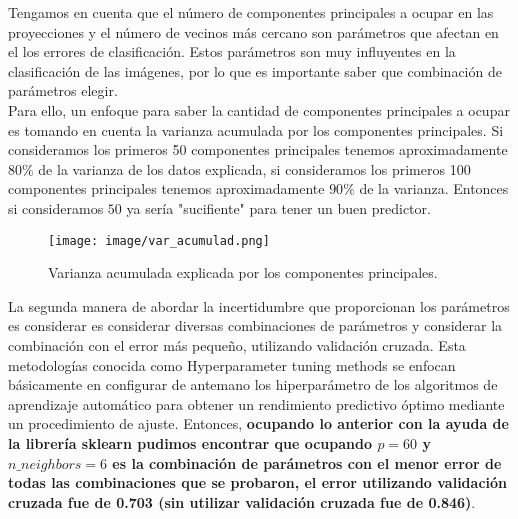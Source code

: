 \documentclass[paper=letter, fontsize=11pt]{scrartcl}
\numberwithin{equation}{section} %
\numberwithin{figure}{section} %
\numberwithin{table}{section} %
\begin{document}
Tengamos en cuenta que el número de componentes principales a ocupar en las proyecciones y el número de vecinos más cercano son parámetros que afectan en el  los errores de clasificación. Estos parámetros son muy influyentes en la clasificación de las imágenes, por lo que es importante saber que combinación de parámetros elegir. \\

Para ello, un enfoque para saber la cantidad de componentes principales a ocupar es tomando en cuenta la varianza acumulada por los componentes principales. Si consideramos los primeros 50 componentes principales tenemos aproximadamente $80\%$ de la varianza de los datos explicada, si consideramos los primeros 100 componentes principales tenemos aproximadamente $90\%$ de la varianza. Entonces si consideramos $50$ ya sería "sucifiente" para tener un buen predictor. 
\begin{figure}[H]
    \centering
    \texttt{[image: image/var\_acumulad.png]}
    \caption{Varianza acumulada explicada por los componentes principales.}
    \label{fig:var_acumulad}
\end{figure}
La segunda manera de abordar la incertidumbre que proporcionan los parámetros es considerar es considerar diversas combinaciones de parámetros y considerar la combinación con el error más pequeño, utilizando validación cruzada. Esta metodologías conocida como Hyperparameter tuning methods se enfocan básicamente en configurar de antemano los hiperparámetro de los algoritmos de aprendizaje automático para obtener un rendimiento predictivo óptimo mediante un procedimiento de ajuste. \cite{tunability} Entonces, \textbf{ocupando lo anterior con la ayuda de la librería sklearn pudimos encontrar que ocupando $p=60$ y $n\_neighbors=6$ es la combinación de parámetros con el menor error de todas las combinaciones que se probaron, el error utilizando validación cruzada fue de 0.703 (sin utilizar validación cruzada fue de 0.846)}.\\
\end{document}
